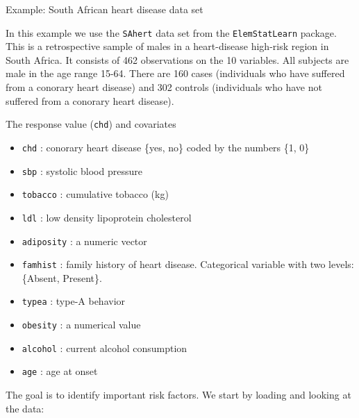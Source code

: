 \documentclass[10pt,ignorenonframetext,]{beamer}
\providecommand{\tightlist}{%
  \setlength{\itemsep}{0pt}\setlength{\parskip}{0pt}}
\begin{document}
\begin{frame}[fragile]

\begin{block}{Example: South African heart disease data set}

In this example we use the \texttt{SAhert} data set from the
\texttt{ElemStatLearn} package. This is a retrospective sample of males
in a heart-disease high-risk region in South Africa. It consists of 462
observations on the 10 variables. All subjects are male in the age range
15-64. There are 160 cases (individuals who have suffered from a
conorary heart disease) and 302 controls (individuals who have not
suffered from a conorary heart disease).

\end{block}

\end{frame}

\begin{frame}[fragile]

The response value (\texttt{chd}) and covariates

\begin{itemize}
\tightlist
\item
  \texttt{chd} : conorary heart disease \{yes, no\} coded by the numbers
  \{1, 0\}
\item
  \texttt{sbp} : systolic blood pressure\\
\item
  \texttt{tobacco} : cumulative tobacco (kg)\\
\item
  \texttt{ldl} : low density lipoprotein cholesterol
\item
  \texttt{adiposity} : a numeric vector
\item
  \texttt{famhist} : family history of heart disease. Categorical
  variable with two levels: \{Absent, Present\}.
\item
  \texttt{typea} : type-A behavior
\item
  \texttt{obesity} : a numerical value
\item
  \texttt{alcohol} : current alcohol consumption
\item
  \texttt{age} : age at onset
\end{itemize}

The goal is to identify important risk factors. We start by loading and
looking at the data:

\end{frame}
\end{document}
